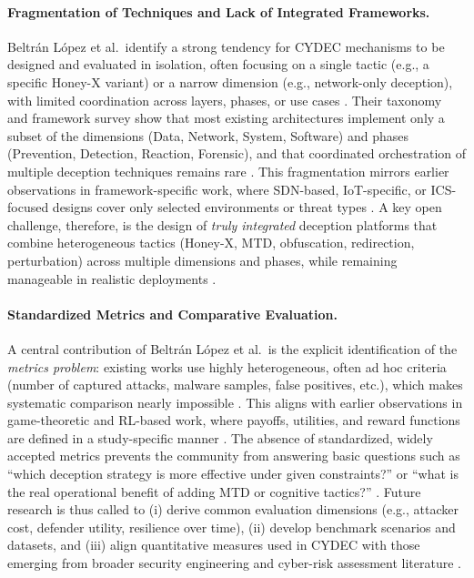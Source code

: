 \paragraph{Fragmentation of Techniques and Lack of Integrated Frameworks.}
Beltrán López et al.\ identify a strong tendency for CYDEC mechanisms to be designed and evaluated in isolation,
often focusing on a single tactic (e.g., a specific Honey-X variant) or a narrow dimension (e.g., network-only deception),
with limited coordination across layers, phases, or use cases \cite{deceptiontrends2024}. Their taxonomy and framework survey
show that most existing architectures implement only a subset of the dimensions (Data, Network, System, Software) and
phases (Prevention, Detection, Reaction, Forensic), and that coordinated orchestration of multiple deception techniques
remains rare \cite{deceptiontrends2024}. This fragmentation mirrors earlier observations in framework-specific work,
where SDN-based, IoT-specific, or ICS-focused designs cover only selected environments or threat types
\cite{dolos2023,hammad2024deep,aiipot2023}. A key open challenge, therefore, is the design of \emph{truly integrated} deception
platforms that combine heterogeneous tactics (Honey-X, MTD, obfuscation, redirection, perturbation) across multiple
dimensions and phases, while remaining manageable in realistic deployments \cite{deceptiontrends2024}.

\paragraph{Standardized Metrics and Comparative Evaluation.}
A central contribution of Beltrán López et al.\ is the explicit identification of the \emph{metrics problem}:
existing works use highly heterogeneous, often ad hoc criteria (number of captured attacks, malware samples, false positives, etc.),
which makes systematic comparison nearly impossible \cite{deceptiontrends2024}. This aligns with earlier observations
in game-theoretic and RL-based work, where payoffs, utilities, and reward functions are defined in a study-specific manner
\cite{pawlick2019game,hammad2024deep}. The absence of standardized, widely accepted metrics prevents the community from answering
basic questions such as “which deception strategy is more effective under given constraints?” or “what is the real operational benefit
of adding MTD or cognitive tactics?” \cite{deceptiontrends2024}. Future research is thus called to (i) derive common evaluation
dimensions (e.g., attacker cost, defender utility, resilience over time), (ii) develop benchmark scenarios and datasets, and (iii) align
quantitative measures used in CYDEC with those emerging from broader security engineering and cyber-risk assessment literature
\cite{deceptiontrends2024,pawlick2019game}.

